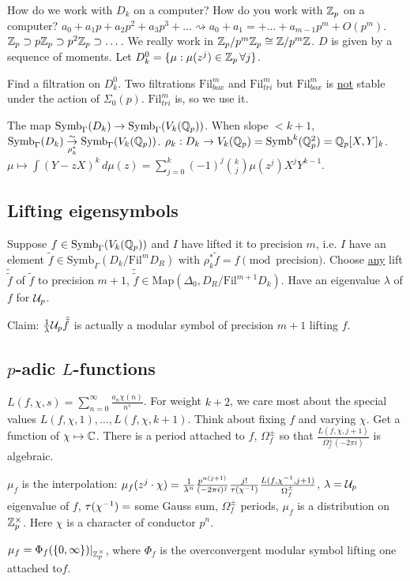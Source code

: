 \documentclass[]{article}
\begin{document}
How do we work with $D_k$ on a computer?
How do you work with $\mathbb{Z}_p$ on a computer? $a_0+a_1p+a_2p^2+a_3p^3+\dots \rightsquigarrow a_0+a_1=+\dots + a_{m-1}p^m + O(p^m)$. $\mathbb{Z}_p\supset p\mathbb{Z}_p\supset p^2\mathbb{Z}_p\supset \dots$. We really work in $\mathbb{Z}_p/p^m\mathbb{Z}_p \cong \mathbb{Z}/p^m\mathbb{Z}$.
$D$ is given by a sequence of moments. Let $D_k^0 = \{\mu:\mu(z^j)\in \mathbb{Z}_p\,\forall j\}$.

Find a filtration on $D_k^0$.
Two filtrations $\text{Fil}_{box}^m$ and $\text{Fil}_{tri}^m$ but $\text{Fil}_{box}^m$ is \ul{not} stable under the action of $\Sigma_0(p)$. $\text{Fil}_{tri}^m$ is, so we use it.

\begin{recall}
	The map $\text{Symb}_\Gamma(D_k) \rightarrow \text{Symb}_\Gamma(V_k(\mathbb{Q}_p))$. When slope $<k+1$,  $\text{Symb}_\Gamma(D_k) \underset{\rho_k^*}{\overset{\sim}{\rightarrow}} \text{Symb}_\Gamma(V_k(\mathbb{Q}_p))$.
	$\rho_k: D_k \rightarrow V_k(\mathbb{Q}_p) = \text{Symb}^k(\mathbb{Q}_p^2) = \mathbb{Q}_p[X,Y]_k$. $\mu \mapsto \int (Y-zX)^k \, d\mu(z) = \sum_{j=0}^k(-1)^j\binom{k}{j}\mu(z^j) X^j Y^{k-1}$.
\end{recall}

\subsection*{Lifting eigensymbols}

Suppose $f\in \text{Symb}_\Gamma(V_k(\mathbb{Q}_p))$ and $I$ have lifted it to precision $m$, i.e. $I$ have an element $\tilde{f} \in \text{Symb}_\Gamma(D_k/\text{Fil}^mD_R)$ with $\rho_k^*\tilde{f} = f \pmod{\text{precision}}$. Choose \ul{any} lift $\tilde{\tilde{f}}$ of $\tilde{f}$ to precision $m+1$, $\tilde{\tilde{f}}\in \text{Map}(\Delta_0,D_R/\text{Fil}^{m+1}D_k)$. Have an eigenvalue $\lambda$ of $f$ for $\mathcal{U}_p$.

Claim: $\frac{1}{\lambda} \mathcal{U}_p \tilde{\tilde{f}}$ is actually a modular symbol of precision $m+1$ lifting $f$.

\subsection*{$p$-adic $L$-functions}

$L(f,\chi,s) = \sum_{n=0}^\infty \frac{a_n\chi(n)}{n^s}$. For weight $k+2$, we care most about the special values $L(f,\chi,1),\dots,L(f,\chi,k+1)$. Think about fixing $f$ and varying $\chi$. Get a function of $\chi \mapsto \mathbb{C}$. There is a period attached to $f$, $\Omega_f^\pm$ so that $\frac{L(f,\chi,j+1)}{\Omega_f^\pm(-2\pi i)}$ is algebraic.

$\mu_f$ is the interpolation: $\mu_f(z^j\cdot \chi) = \frac{1}{\lambda^n}\frac{p^{n(j+1)}}{(-2\pi i)^j} \frac{j!}{\tau(\chi^{-1})} \frac{L(f,\chi^{-1},j+1)}{\Omega_f^\pm}$, $\lambda = \mathcal{U}_p$ eigenvalue of $f$, $\tau(\chi^{-1}) = $ some Gauss sum, $\Omega_f^\pm$ periods, $\mu_f$ is a distribution on $\mathbb{Z}_p^\times$. Here $\chi$ is a character of conductor $p^n$.

\begin{theorem}
	$\mu_f = \Phi_f(\{0,\infty\})|_{\mathbb{Z}_p^\times}$, where $\Phi_f$ is the overconvergent modular symbol lifting one attached to$f$.
\end{theorem}
\end{document}

